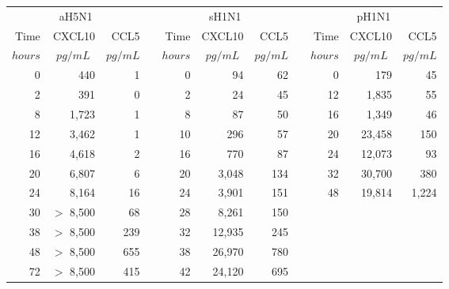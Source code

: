 \documentclass[10pt]{article}
\begin{document}

\renewcommand{\thetable}{S\arabic{table}}

\begin{table}[!ht]
\begin{center}
\begin{tabular}{| r r r | c | r r r | c | r r r |}
  \multicolumn{3}{c}{aH5N1} & \multicolumn{1}{c}{} & \multicolumn{3}{c}{sH1N1} & \multicolumn{1}{c}{} & \multicolumn{3}{c}{pH1N1}\\
  \cline{1-3} \cline{5-7} \cline{9-11}
  Time & CXCL10 & CCL5 & & Time & CXCL10 & CCL5 & & Time & CXCL10 & CCL5 \\
   \multicolumn{1}{|c}{\footnotesize{$hours$}} & \multicolumn{1}{c}{\footnotesize{$pg/mL$}} & \multicolumn{1}{c|}{\footnotesize{$pg/mL$}} & & \multicolumn{1}{c}{\footnotesize{$hours$}} & \multicolumn{1}{c}{\footnotesize{$pg/mL$}} & \multicolumn{1}{c|}{\footnotesize{$pg/mL$}} & & \multicolumn{1}{c}{\footnotesize{$hours$}} & \multicolumn{1}{c}{\footnotesize{$pg/mL$}} & \multicolumn{1}{c|}{\footnotesize{$pg/mL$}}\\
  \cline{1-3} \cline{5-7} \cline{9-11}
  0 & 440 & 1 & & 0 & 94 & 62 & & 0 & 179 & 45  \\
  2 & 391 & 0 & & 2 & 24 & 45 & & 12 & 1,835 & 55 \\
  8 & 1,723 & 1 & & 8 & 87 & 50 & & 16 & 1,349 & 46 \\
  12 & 3,462 & 1 & & 10 & 296 & 57 & & 20 & 23,458 & 150 \\
  16 & 4,618 & 2 & & 16 & 770 & 87 & & 24 & 12,073 & 93 \\
  20 & 6,807 & 6 & & 20 & 3,048 & 134 & & 32 & 30,700 & 380 \\
  24 & 8,164 & 16 & & 24 & 3,901 & 151 & & 48 & 19,814 & 1,224  \\
  30 & $>$ 8,500 & 68 & & 28 & 8,261 & 150 &  &  &  &  \\
  38 & $>$ 8,500 & 239 & & 32 & 12,935 & 245 &  &  &  &  \\
  48 & $>$ 8,500 & 655 & & 38 & 26,970 & 780 &  &  &  &  \\
  72 & $>$ 8,500 & 415 & & 42 & 24,120 & 695 &  &  &  &  \\

\end{tabular}
\end{center}
\end{table}
\end{document}

